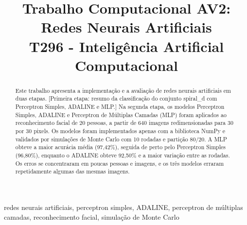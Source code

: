 \documentclass[conference]{IEEEtran}
\newcommand{\pendente}[1]{{\color{red}[#1]}}
\begin{document}
\title{Trabalho Computacional AV2: Redes Neurais Artificiais \\
{\footnotesize T296 - Inteligência Artificial Computacional}}

\author{
\and
{}
\and
{}
}

\maketitle

\begin{abstract}
Este trabalho apresenta a implementação e a avaliação de redes neurais
artificiais em duas etapas.
\pendente{Primeira etapa: resumo da classificação do conjunto spiral\_d com
Perceptron Simples, ADALINE e MLP.}
Na segunda etapa, os modelos Perceptron Simples, ADALINE e Perceptron de
Múltiplas Camadas (MLP) foram aplicados ao reconhecimento facial de 20
pessoas, a partir de 640 imagens redimensionadas para 30 por 30 pixels. Os
modelos foram implementados apenas com a biblioteca NumPy e validados por
simulações de Monte Carlo com 10 rodadas e partição 80/20. A MLP obteve a
maior acurácia média (97,42\%), seguida de perto pelo Perceptron Simples
(96,80\%), enquanto o ADALINE obteve 92,50\% e a maior variação entre as
rodadas. Os erros se concentraram em poucas pessoas e imagens, e os três
modelos erraram repetidamente algumas das mesmas imagens.
\end{abstract}

\begin{IEEEkeywords}
redes neurais artificiais, perceptron simples, ADALINE, perceptron de
múltiplas camadas, reconhecimento facial, simulação de Monte Carlo
\end{IEEEkeywords}
\end{document}
